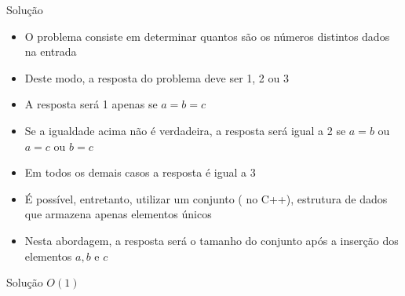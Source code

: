 \begin{frame}[fragile]{Solução}

    \begin{itemize}
        \item O problema consiste em determinar quantos são os números distintos dados na
            entrada

        \item Deste modo, a resposta do problema deve ser 1, 2 ou 3

        \item A resposta será 1 apenas se $a = b = c$

        \item Se a igualdade acima não é verdadeira, a resposta será igual a 2 se $a = b$ ou
            $a = c$ ou $b = c$

        \item Em todos os demais casos a resposta é igual a 3

        \item É possível, entretanto, utilizar um conjunto ( no C++), estrutura
            de dados que armazena apenas elementos únicos

        \item Nesta abordagem, a resposta será o tamanho do conjunto após a inserção dos elementos
            $a, b$ e $c$
    \end{itemize}

\end{frame}

\begin{frame}[fragile]{Solução $O(1)$}
\end{frame}
